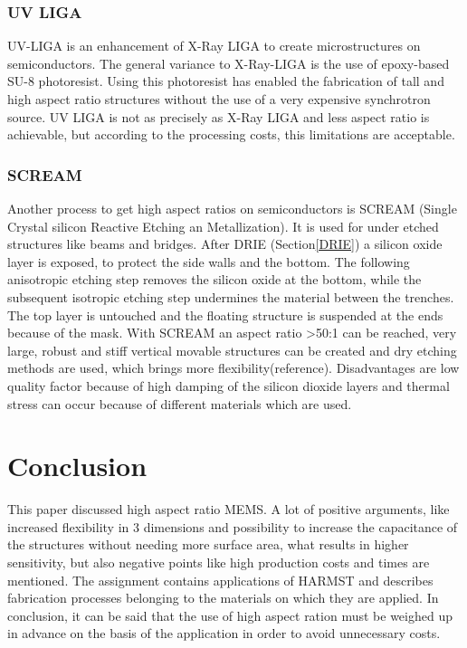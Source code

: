 \documentclass[a4paper,
  twoside, %
  headlines=2.1 %
  ]{scrartcl}
\begin{document}
\subsubsection{UV LIGA}\label{uv_liga}
UV-LIGA is an enhancement of X-Ray LIGA to create microstructures on semiconductors. The general variance to X-Ray-LIGA is the use of epoxy-based SU-8 photoresist. Using this photoresist has enabled the fabrication of tall and high aspect ratio structures without the use of a very expensive synchrotron source\cite{genolet2014uv}. UV LIGA is not as precisely as X-Ray LIGA and less aspect ratio is achievable, but according to the processing costs, this limitations are acceptable\cite{wikiUVLiga}.

\subsubsection{SCREAM}
Another process to get high aspect ratios on semiconductors is SCREAM (Single Crystal silicon Reactive Etching an Metallization). It is used for under etched structures like beams and bridges. After DRIE (Section\ref{DRIE}) a silicon oxide layer is exposed, to protect the side walls and the bottom. The following anisotropic etching step removes the silicon oxide at the bottom, while the subsequent isotropic etching step undermines the material between the trenches. The top layer is untouched and the floating structure is suspended at the ends because of the mask\cite{menz2005paul}. With SCREAM an aspect ratio >50:1 can be reached, very large, robust and stiff vertical movable structures can be created and dry etching methods are used, which brings more flexibility(reference). Disadvantages are low quality factor because of high damping of the silicon dioxide layers and thermal stress can occur because of different materials which are used\cite{macdonald1996scream}.

\section{Conclusion}
This paper discussed high aspect ratio MEMS. A lot of positive arguments, like increased flexibility in 3 dimensions and possibility to increase the capacitance of the structures without needing more surface area, what results in higher sensitivity, but also negative points like high production costs and times are mentioned. The assignment contains applications of HARMST and describes fabrication processes belonging to the materials on which they are applied. In conclusion, it can be said that the use of high aspect ration must be weighed up in advance on the basis of the application in order to avoid unnecessary costs.




\end{document}
